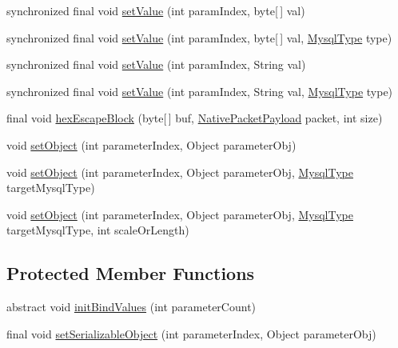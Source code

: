 \begin{DoxyCompactItemize}
\item 
synchronized final void \mbox{\hyperlink{classcom_1_1mysql_1_1cj_1_1_abstract_query_bindings_a2baacdf89019d5ad8cadbbec82603991}{set\+Value}} (int param\+Index, byte\mbox{[}$\,$\mbox{]} val)
\item 
synchronized final void \mbox{\hyperlink{classcom_1_1mysql_1_1cj_1_1_abstract_query_bindings_a7d6e6794a12d22bc55d8c5bd33640e3c}{set\+Value}} (int param\+Index, byte\mbox{[}$\,$\mbox{]} val, \mbox{\hyperlink{enumcom_1_1mysql_1_1cj_1_1_mysql_type}{Mysql\+Type}} type)
\item 
synchronized final void \mbox{\hyperlink{classcom_1_1mysql_1_1cj_1_1_abstract_query_bindings_a43058029a8ced3bde792ae2c9c107fff}{set\+Value}} (int param\+Index, String val)
\item 
synchronized final void \mbox{\hyperlink{classcom_1_1mysql_1_1cj_1_1_abstract_query_bindings_a2c33843c7f8093c1a56583fa57510456}{set\+Value}} (int param\+Index, String val, \mbox{\hyperlink{enumcom_1_1mysql_1_1cj_1_1_mysql_type}{Mysql\+Type}} type)
\item 
final void \mbox{\hyperlink{classcom_1_1mysql_1_1cj_1_1_abstract_query_bindings_a013ed20b0641202207651a5aea06f215}{hex\+Escape\+Block}} (byte\mbox{[}$\,$\mbox{]} buf, \mbox{\hyperlink{classcom_1_1mysql_1_1cj_1_1protocol_1_1a_1_1_native_packet_payload}{Native\+Packet\+Payload}} packet, int size)
\item 
void \mbox{\hyperlink{classcom_1_1mysql_1_1cj_1_1_abstract_query_bindings_a1dee6ee1875e05ebced2c60984c0c8e7}{set\+Object}} (int parameter\+Index, Object parameter\+Obj)
\item 
void \mbox{\hyperlink{classcom_1_1mysql_1_1cj_1_1_abstract_query_bindings_a761eb9a0e429674a6fe9a4a29db29f8b}{set\+Object}} (int parameter\+Index, Object parameter\+Obj, \mbox{\hyperlink{enumcom_1_1mysql_1_1cj_1_1_mysql_type}{Mysql\+Type}} target\+Mysql\+Type)
\item 
void \mbox{\hyperlink{classcom_1_1mysql_1_1cj_1_1_abstract_query_bindings_a3a10937bc972e71cbf2b2ffde0578898}{set\+Object}} (int parameter\+Index, Object parameter\+Obj, \mbox{\hyperlink{enumcom_1_1mysql_1_1cj_1_1_mysql_type}{Mysql\+Type}} target\+Mysql\+Type, int scale\+Or\+Length)
\end{DoxyCompactItemize}
\subsection*{Protected Member Functions}
\begin{DoxyCompactItemize}
\item 
abstract void \mbox{\hyperlink{classcom_1_1mysql_1_1cj_1_1_abstract_query_bindings_a0640614206a5c3d6b9e5be8adcfb0d8d}{init\+Bind\+Values}} (int parameter\+Count)
\item 
final void \mbox{\hyperlink{classcom_1_1mysql_1_1cj_1_1_abstract_query_bindings_a9ab53fee30aef97d392c20362be03608}{set\+Serializable\+Object}} (int parameter\+Index, Object parameter\+Obj)
\end{DoxyCompactItemize}
